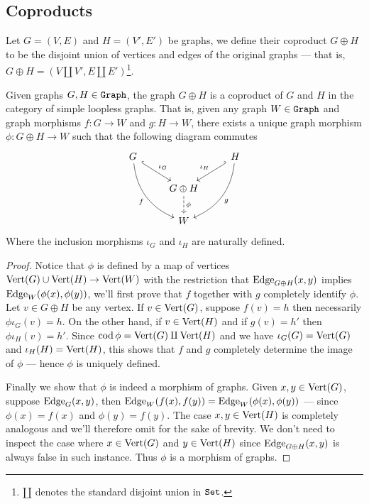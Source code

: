 \subsection{Coproducts}

\begin{definition}[Coproduct]\label{def: coprod-graph}
    Let \(G = (V, E)\) and \(H = (V', E')\) be graphs, we define their coproduct
    \(G \oplus H\) to be the disjoint union of vertices and edges of the original
    graphs --- that is, \(G \oplus H = (V \amalg V', E \amalg
    E')\)\footnote{\(\amalg\) denotes the standard disjoint union in \({\texttt{Set}}\).}.
\end{definition}

\begin{proposition}
    \label{prop: coprod-graph}
    Given graphs \(G, H \in {\texttt{Graph}}\), the graph \(G \oplus H\) is a coproduct of
    \(G\) and \(H\) in the category of simple loopless graphs. That is, given any
    graph \(W \in {\texttt{Graph}}\) and graph morphisms \(f: G \to W\) and \(g: H \to W\),
    there exists a unique graph morphism \(\phi: G \oplus H \to W\) such that the
    following diagram commutes
    \[
        \begin{tikzcd}
            G \ar[dr, hook, "\iota_G"] \ar[ddr, swap, bend right, "f"]
            & &H \ar[dl, swap, hook', "\iota_{H}"] \ar[ddl, bend left, "g"]
            \\
            &G \oplus H \ar[d, dashed, "\phi"]
            \\
            &W &
        \end{tikzcd}
    \]
    Where the inclusion morphisms \(\iota_G\) and \(\iota_{H}\) are naturally
    defined.
\end{proposition}

\begin{proof}
    Notice that \(\phi\) is defined by a map of vertices \(\operatorname{Vert}(G) \cup \operatorname{Vert}(H) \to
    \operatorname{Vert}(W)\) with the restriction that \(\operatorname{Edge}_{G \oplus H}(x, y)\) implies
    \(\operatorname{Edge}_W(\phi(x), \phi(y))\), we'll first prove that \(f\) together with \(g\)
    completely identify \(\phi\). Let \(v \in G \oplus H\) be any vertex. If \(v
    \in \operatorname{Vert}(G)\), suppose \(f(v) = h\) then necessarily \(\phi \iota_G(v) = h\). On
    the other hand, if \(v \in \operatorname{Vert}(H)\) and if \(g(v) = h'\) then \(\phi
    \iota_{H}(v) = h'\). Since \(\operatorname{cod} \phi = \operatorname{Vert}(G) \amalg \operatorname{Vert}(H)\) and we have
    \(\iota_G(G) = \operatorname{Vert}(G)\) and \(\iota_{H}(H) = \operatorname{Vert}(H)\), this shows that \(f\) and
    \(g\) completely determine the image of \(\phi\) --- hence \(\phi\) is
    uniquely defined.

    Finally we show that \(\phi\) is indeed a morphism of graphs. Given \(x, y \in
    \operatorname{Vert}(G)\), suppose \(\operatorname{Edge}_G(x, y)\), then \(\operatorname{Edge}_W(f(x), f(y)) = \operatorname{Edge}_W(\phi(x),
    \phi(y))\) --- since \(\phi(x) = f(x)\) and \(\phi(y) = f(y)\). The case \(x,
    y \in \operatorname{Vert}(H)\) is completely analogous and we'll therefore omit for the sake of
    brevity. We don't need to inspect the case where \(x \in \operatorname{Vert}(G)\) and \(y \in
    \operatorname{Vert}(H)\) since \(\operatorname{Edge}_{G \oplus H}(x, y)\) is always false in such instance. Thus
    \(\phi\) is a morphism of graphs.
\end{proof}

